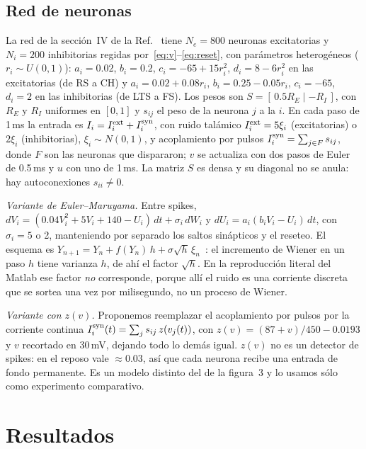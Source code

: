 \documentclass[10pt,a4paper,twocolumn]{article}
\begin{document}
\subsection{Red de neuronas}
La red de la sección~IV de la Ref.~\cite{izhikevich2003} tiene $N_e=800$ neuronas
excitatorias y $N_i=200$ inhibitorias regidas por~\eqref{eq:v}--\eqref{eq:reset}, con
parámetros heterogéneos ($r_i\sim U(0,1)$): $a_i=\num{0.02}$, $b_i=\num{0.2}$,
$c_i=-65+15r_i^2$, $d_i=8-6r_i^2$ en las excitatorias (de RS a CH) y
$a_i=\num{0.02}+\num{0.08}r_i$, $b_i=\num{0.25}-\num{0.05}r_i$, $c_i=-65$, $d_i=2$ en las
inhibitorias (de LTS a FS). Los pesos son $S=[\,\num{0.5}R_E\mid -R_I\,]$, con $R_E$ y
$R_I$ uniformes en $[0,1]$ y $s_{ij}$ el peso de la neurona $j$ a la $i$. En cada paso
de 1\,ms la entrada es $I_i=I_i^{\rm ext}+I_i^{\rm syn}$, con ruido talámico
$I_i^{\rm ext}=5\xi_i$ (excitatorias) o $2\xi_i$ (inhibitorias), $\xi_i\sim N(0,1)$, y
acoplamiento por pulsos $I_i^{\rm syn}=\sum_{j\in F}s_{ij}$, donde $F$ son las neuronas
que dispararon; $v$ se actualiza con dos pasos de Euler de \num{0.5}\,ms y $u$ con uno
de 1\,ms. La matriz $S$ es densa y su diagonal no se anula: hay autoconexiones
$s_{ii}\neq0$.

\emph{Variante de Euler--Maruyama.} Entre spikes,
$dV_i=(\num{0.04}V_i^2+5V_i+140-U_i)\,dt+\sigma_i\,dW_i$ y $dU_i=a_i(b_iV_i-U_i)\,dt$, con
$\sigma_i=5$ o 2, manteniendo por separado los saltos sinápticos y el reseteo. El
esquema es $Y_{n+1}=Y_n+f(Y_n)\,h+\sigma\sqrt h\,\xi_n$~\cite{em}: el incremento de
Wiener en un paso $h$ tiene varianza $h$, de ahí el factor $\sqrt h$. En la
reproducción literal del Matlab ese factor \emph{no} corresponde, porque allí el ruido
es una corriente discreta que se sortea una vez por milisegundo, no un proceso de
Wiener.

\emph{Variante con $z(v)$.} Proponemos reemplazar el acoplamiento por pulsos por la
corriente continua $I_i^{\rm syn}(t)=\sum_j s_{ij}\,z(v_j(t))$, con
$z(v)=(87+v)/450-\num{0.0193}$ y $v$ recortado en 30\,mV, dejando todo lo demás igual.
$z(v)$ no es un detector de spikes: en el reposo vale $\approx\num{0.03}$, así que cada
neurona recibe una entrada de fondo permanente. Es un modelo distinto del de la
figura~3 y lo usamos sólo como experimento comparativo.

\section{Resultados}
\end{document}
